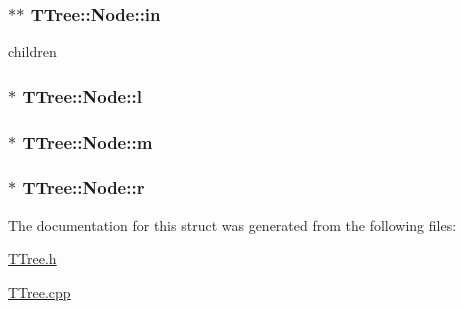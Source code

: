 \subsubsection[{in}]{$\ast$$\ast$ T\+Tree\+::\+Node\+::in}\label{structTTree_1_1Node_ab126c67191b7e91a1eccc18a3eeadf0b}


children 

\hypertarget{structTTree_1_1Node_a78f1bf067928d0e0106e1187364cc69e}{}
\subsubsection[{l}]{$\ast$ T\+Tree\+::\+Node\+::l}\label{structTTree_1_1Node_a78f1bf067928d0e0106e1187364cc69e}
\hypertarget{structTTree_1_1Node_a3f47f1068b4631b1d9eddea0300c6bee}{}
\subsubsection[{m}]{ $\ast$ T\+Tree\+::\+Node\+::m}\label{structTTree_1_1Node_a3f47f1068b4631b1d9eddea0300c6bee}
\hypertarget{structTTree_1_1Node_adb67ed846e6787b3ff26bbcee11ee4b6}{}
\subsubsection[{r}]{ $\ast$ T\+Tree\+::\+Node\+::r}\label{structTTree_1_1Node_adb67ed846e6787b3ff26bbcee11ee4b6}


The documentation for this struct was generated from the following files\+:\begin{DoxyCompactItemize}
\item 
\hyperlink{TTree_8h}{T\+Tree.\+h}\item 
\hyperlink{TTree_8cpp}{T\+Tree.\+cpp}\end{DoxyCompactItemize}
